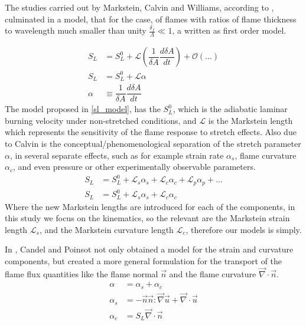 The studies carried out by Markstein, Calvin and Williams, according to \cite{bradley_1996}, culminated in a model, that for the case, of flames with ratios of flame thickness to wavelength much smaller than unity $\frac{\delta_f}{\Lambda}\ll 1$, a written as first order model. 

\begin{assumption}
\begin{align}
	S_L&=S_L^0 + \mathscr{L}\left( \dfrac{1}{\delta A} \dfrac{d \delta A}{dt}\right)+\mathcal{O}(...)\nonumber \\ 
	S_L&=S_L^0 + \mathscr{L}\alpha \label{sl_model} \\
	\alpha &\equiv \dfrac{1}{\delta A} \dfrac{d \delta A}{dt}
\end{align}	 
The model proposed in \eqref{sl_model}, has the $S_L^0$, which is the adiabatic laminar burning velocity under non-stretched conditions, and $\mathscr{L}$ is the Markstein length which represents the sensitivity of the flame response to stretch effects.
Also due to Calvin is the conceptual/phenomenological separation of the stretch parameter $\alpha$, in several separate effects, such as for example strain rate $\alpha_s$, flame curvature $\alpha_c$, and even pressure or other experimentally observable parameters. 
\begin{align}
	S_L&= S_L^0 + \mathscr{L}_s \alpha_s+ \mathscr{L}_c \alpha_c + \mathscr{L}_p \alpha_p + ... \nonumber \\
	S_L&=S_L^0 + \mathscr{L}_s \alpha_s+ \mathscr{L}_c \alpha_c 
\end{align}
Where the new Markstein lengths are introduced for each of the components, in this study we focus on the kinematics, so the relevant are the Markstein strain length $\mathscr{L}_s$, and the Markstein curvature length $\mathscr{L}_c$, therefore our models is simply. 

\end{assumption}
	
\begin{theorem}
In \cite{candel_1990}, Candel and Poinsot not only obtained a model for the strain and curvature components, but created a more general formulation for the transport of the flame flux quantities like the flame normal $\vec{n}$ and the flame curvature $\vec{\nabla}\cdot \vec{n}$.
\begin{align}
	\alpha &=\alpha_s + \alpha_c\\
	\alpha_s&= -\vec{n} \vec{n}:\vec{\nabla} \vec{u}+ \vec{\nabla}\cdot \vec{u}\\
	\alpha_c&= S_L \vec{\nabla}\cdot \vec{n}
\end{align}
\end{theorem}


